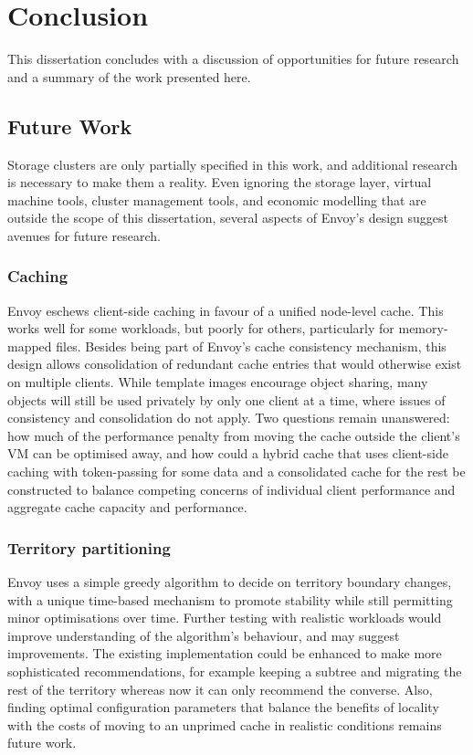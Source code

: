 \chapter{Conclusion}\label{cha:conclusion}

This dissertation concludes with a discussion of opportunities for future research and a summary of the work presented here.

\section{Future Work}

Storage clusters are only partially specified in this work, and additional research is necessary to make them a reality. Even ignoring the storage layer, virtual machine tools, cluster management tools, and economic modelling that are outside the scope of this dissertation, several aspects of Envoy's design suggest avenues for future research.

\subsection{Caching}

Envoy eschews client-side caching in favour of a unified node-level cache. This works well for some workloads, but poorly for others, particularly for memory-mapped files. Besides being part of Envoy's cache consistency mechanism, this design allows consolidation of redundant cache entries that would otherwise exist on multiple clients. While template images encourage object sharing, many objects will still be used privately by only one client at a time, where issues of consistency and consolidation do not apply. Two questions remain unanswered: how much of the performance penalty from moving the cache outside the client's VM can be optimised away, and how could a hybrid cache that uses client-side caching with token-passing for some data and a consolidated cache for the rest be constructed to balance competing concerns of individual client performance and aggregate cache capacity and performance.

\subsection{Territory partitioning}

Envoy uses a simple greedy algorithm to decide on territory boundary changes, with a unique time-based mechanism to promote stability while still permitting minor optimisations over time. Further testing with realistic workloads would improve understanding of the algorithm's behaviour, and may suggest improvements. The existing implementation could be enhanced to make more sophisticated recommendations, for example keeping a subtree and migrating the rest of the territory whereas now it can only recommend the converse. Also, finding optimal configuration parameters that balance the benefits of locality with the costs of moving to an unprimed cache in realistic conditions remains future work.

